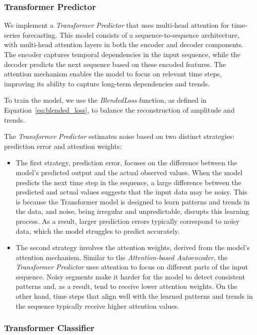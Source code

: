\subsubsection{Transformer Predictor}

We implement a \emph{Transformer Predictor }that uses multi-head attention for time-series forecasting. This model consists of a sequence-to-sequence architecture, with multi-head attention layers in both the encoder and decoder components. The encoder captures temporal dependencies in the input sequence, while the decoder predicts the next sequence based on these encoded features. The attention mechanism enables the model to focus on relevant time steps, improving its ability to capture long-term dependencies and trends.

To train the model, we use the \emph{BlendedLoss} function, as defined in Equation~\ref{eq:blended_loss}, to balance the reconstruction of amplitude and trends.

The \emph{Transformer Predictor} estimates noise based on two distinct strategies: prediction error and attention weights:
\begin{itemize}
    \item The first strategy, prediction error, focuses on the difference between the model's predicted output and the actual observed values. When the model predicts the next time step in the sequence, a large difference between the predicted and actual values suggests that the input data may be noisy. This is because the Transformer model is designed to learn patterns and trends in the data, and noise, being irregular and unpredictable, disrupts this learning process. As a result, larger prediction errors typically correspond to noisy data, which the model struggles to predict accurately.
    \vspace{-0.2cm}
    \item The second strategy involves the attention weights, derived from the model’s attention mechanism. Similar to the \emph{Attention-based Autoencoder}, the \emph{Transformer Predictor} uses attention to focus on different parts of the input sequence. Noisy segments make it harder for the model to detect consistent patterns and, as a result, tend to receive lower attention weights. On the other hand, time steps that align well with the learned patterns and trends in the sequence typically receive higher attention values.
\end{itemize}

\subsubsection{Transformer Classifier}

